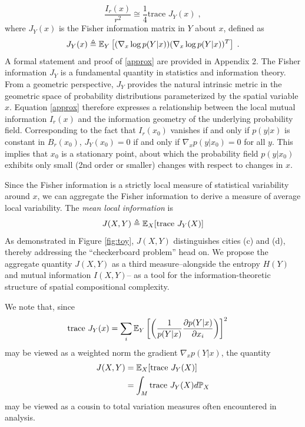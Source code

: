 		\begin{equation}
			\frac{I_r(x)}{r^2} \cong \frac{1}{4} \text{trace } J_Y(x)\;, \label{approx}
		\end{equation}
		where $J_Y(x)$ is the Fisher information matrix in $Y$ about $x$, defined as 
		\begin{equation}
			J_Y(x) \triangleq \mathbb{E}_Y\left[ (\nabla_x \log p(Y|x))(\nabla_x \log p(Y|x))^T \right]\;.
		\end{equation}
		A formal statement and proof of \eqref{approx} are provided in Appendix 2. The Fisher information $J_Y$ is a fundamental quantity in statistics and information theory. From a geometric perspective, $J_Y$ provides the natural intrinsic metric in the geometric space of probability distributions parameterized by the spatial variable $x$. Equation \eqref{approx} therefore expresses a relationship between the local mutual information $I_r(x)$ and the information geometry of the underlying probability field. Corresponding to the fact that $I_r(x_0)$ vanishes if and only if $p(y|x)$ is constant in $B_r(x_0)$, $J_Y(x_0) = 0$ if and only if $\nabla_x p(y|x_0) = 0$ for all $y$. This implies that $x_0$ is a stationary point, about which the probability field $p(y|x_0)$ exhibits only small (2nd order or smaller) changes with respect to changes in $x$. 

		Since the Fisher information is a strictly local measure of statistical variability around $x$, we can aggregate the Fisher information to derive a measure of average local variability. The \emph{mean local information} is 
		\begin{equation}
		J(X,Y) \triangleq \mathbb{E}_X[\text{trace }J_Y(X)]
		\end{equation} 
		As demonstrated in Figure \ref{fig:toy}, $J(X,Y)$ distinguishes cities (c) and (d), thereby addressing the ``checkerboard problem'' head on. We propose the aggregate quantity $J(X,Y)$ as a third  measure--alongside the entropy $H(Y)$ and mutual information $I(X,Y)$-- as a tool for the information-theoretic structure of spatial compositional complexity. 

		We note that, since 
		\begin{align}
			\text{trace } J_Y(x) &=  \sum_i \mathbb{E}_Y\left[ \left(\frac{1}{p(Y|x)} \frac{\partial p(Y|x)}{\partial x_i}\right)\right]^2\;
		\end{align}
		may be viewed as a weighted norm the gradient $\nabla_x p(Y|x)$, the quantity 
		\begin{align}
			J(X,Y) &= \mathbb{E}_X[\text{trace } J_Y(X)] \\
			&= \int_M \text{trace } J_Y(X) d\mathbb{P}_X
		\end{align}
		may be viewed as a cousin to total variation measures often encountered in analysis. 

